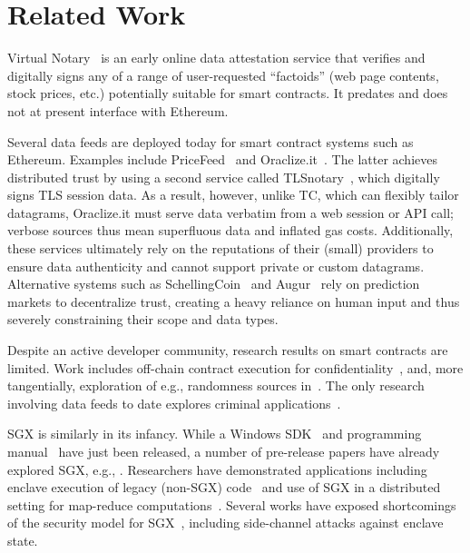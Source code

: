 \section{Related Work}
\label{sec:related}

Virtual Notary~\cite{VN:2013,VN:2016} is an early online data attestation service that verifies and digitally signs any of a range of user-requested ``factoids'' (web page contents, stock prices, etc.) potentially suitable for smart contracts. It predates and does not at present interface with Ethereum.

Several data feeds are deployed today for smart contract systems such as Ethereum. Examples include PriceFeed~\cite{PriceFeed:2016} and Oraclize.it~\cite{Oraclize:2016}. The latter achieves distributed trust by using a second service called TLSnotary~\cite{TLSnotary}, which digitally signs TLS session data. As a result, however, unlike TC, which can flexibly tailor datagrams, Oraclize.it must serve data verbatim from a web session or API call; verbose sources thus mean superfluous data and inflated gas costs. Additionally, these services  ultimately rely on the reputations of their (small) providers to ensure data authenticity and cannot support private or custom datagrams. Alternative systems such as SchellingCoin~\cite{schellingcoin-linebreak} and Augur~\cite{augur} rely on prediction markets to decentralize trust, creating a heavy reliance on human input and thus severely constraining their scope and data types.  


Despite an active developer community, research results on smart contracts are limited. Work includes off-chain contract execution for confidentiality~\cite{hawk}, and, more tangentially, exploration of e.g., randomness sources in~\cite{bonneau2015bitcoin}. The only research involving data feeds to date explores criminal applications~\cite{gyges}.

SGX is similarly in its infancy.
While a Windows SDK~\cite{sgxsdk} and programming manual~\cite{sgxmanual} have just been released, a number of pre-release papers have already explored SGX, e.g., \cite{VC3,7163052,anati2013innovative,McKeen:2013jv,Phegade:2013km}. Researchers have demonstrated applications including enclave execution of legacy (non-SGX) code~\cite{haven} and use of SGX in a distributed setting for map-reduce computations~\cite{VC3}. Several works have exposed shortcomings of the security model for SGX~\cite{sgxexplained,sgxsok,shihardwaretalk}, including side-channel attacks against enclave state. 


